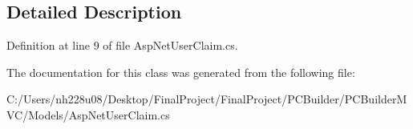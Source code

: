 \subsection{Detailed Description}


Definition at line 9 of file Asp\+Net\+User\+Claim.\+cs.



The documentation for this class was generated from the following file\+:\begin{DoxyCompactItemize}
\item 
C\+:/\+Users/nh228u08/\+Desktop/\+Final\+Project/\+Final\+Project/\+P\+C\+Builder/\+P\+C\+Builder\+M\+V\+C/\+Models/Asp\+Net\+User\+Claim.\+cs\end{DoxyCompactItemize}
